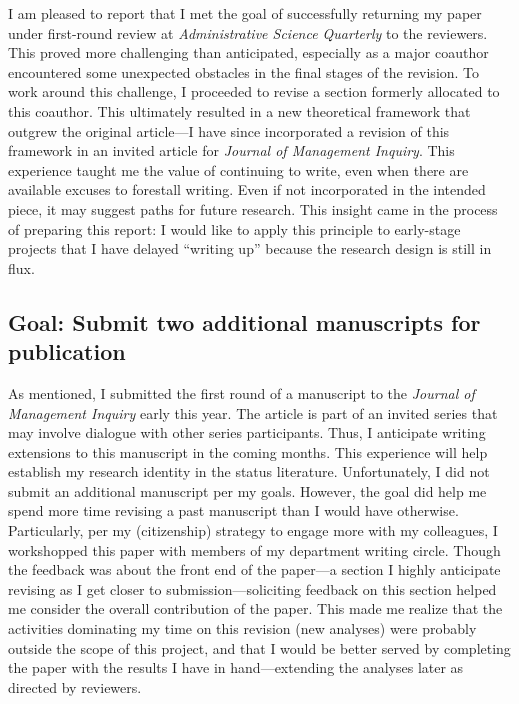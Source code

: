 \documentclass[11pt,article,oneside]{memoir}
\begin{document}
I am pleased to report that I met the goal of successfully returning my
paper under first-round review at \emph{Administrative Science
Quarterly} to the reviewers. This proved more challenging than
anticipated, especially as a major coauthor encountered some unexpected
obstacles in the final stages of the revision. To work around this
challenge, I proceeded to revise a section formerly allocated to this
coauthor. This ultimately resulted in a new theoretical framework that
outgrew the original article---I have since incorporated a revision of
this framework in an invited article for \emph{Journal of Management
Inquiry}. This experience taught me the value of continuing to write,
even when there are available excuses to forestall writing. Even if not
incorporated in the intended piece, it may suggest paths for future
research. This insight came in the process of preparing this report: I
would like to apply this principle to early-stage projects that I have
delayed \enquote{writing up} because the research design is still in
flux.

\subsection{Goal: Submit two additional manuscripts for
publication}\label{goal-submit-two-additional-manuscripts-for-publication}

As mentioned, I submitted the first round of a manuscript to the
\emph{Journal of Management Inquiry} early this year. The article is
part of an invited series that may involve dialogue with other series
participants. Thus, I anticipate writing extensions to this manuscript
in the coming months. This experience will help establish my research
identity in the status literature. Unfortunately, I did not submit an
additional manuscript per my goals. However, the goal did help me spend
more time revising a past manuscript than I would have otherwise.
Particularly, per my (citizenship) strategy to engage more with my
colleagues, I workshopped this paper with members of my department
writing circle. Though the feedback was about the front end of the
paper---a section I highly anticipate revising as I get closer to
submission---soliciting feedback on this section helped me consider the
overall contribution of the paper. This made me realize that the
activities dominating my time on this revision (new analyses) were
probably outside the scope of this project, and that I would be better
served by completing the paper with the results I have in
hand---extending the analyses later as directed by reviewers.
\end{document}
